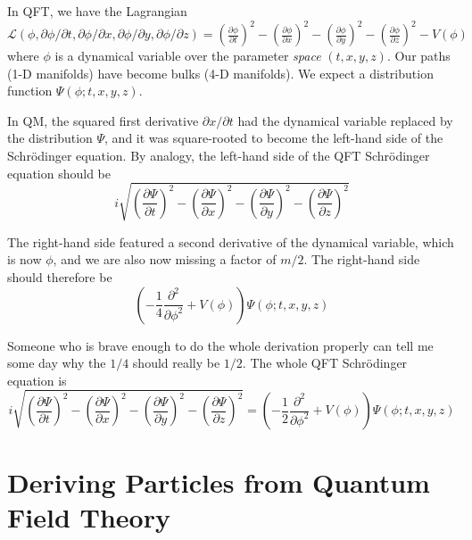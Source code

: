 \documentclass[12pt]{article}
\begin{document}
In QFT, we have the Lagrangian $\mathcal{L}(\phi, \partial
\phi/\partial t, \partial \phi/\partial x, \partial \phi/\partial y,
\partial \phi/\partial z) = \left( \frac{\partial \phi}{\partial t}
\right)^2 - \left( \frac{\partial \phi}{\partial x} \right)^2 - \left(
\frac{\partial \phi}{\partial y} \right)^2 - \left( \frac{\partial
\phi}{\partial z} \right)^2 - V(\phi)$ where $\phi$ is a dynamical
variable over the parameter {\it space} $(t, x, y, z)$.  Our paths
(1-D manifolds) have become bulks (4-D manifolds).  We expect a
distribution function $\Psi(\phi; t, x, y, z)$.

In QM, the squared first derivative $\partial x/\partial t$ had the
dynamical variable replaced by the distribution $\Psi$, and it was
square-rooted to become the left-hand side of the Schr\"odinger
equation.  By analogy, the left-hand side of the QFT Schr\"odinger
equation should be
\begin{equation}
  i\sqrt{\left(\frac{\partial \Psi}{\partial t}\right)^2 -
  \left(\frac{\partial \Psi}{\partial x}\right)^2 - \left(\frac{\partial
  \Psi}{\partial y}\right)^2 - \left(\frac{\partial \Psi}{\partial z}\right)^2}
\end{equation}

The right-hand side featured a second derivative of the dynamical
variable, which is now $\phi$, and we are also now missing a factor of
$m/2$.  The right-hand side should therefore be
\begin{equation}
  \left(-\frac{1}{4} \frac{\partial^2}{\partial \phi^2} + V(\phi)
  \right) \Psi(\phi; t, x, y, z)
\end{equation}

Someone who is brave enough to do the whole derivation properly can
tell me some day why the $1/4$ should really be $1/2$.  The whole
QFT Schr\"odinger equation is
\begin{equation}
  i\sqrt{\left(\frac{\partial \Psi}{\partial t}\right)^2 -
  \left(\frac{\partial \Psi}{\partial x}\right)^2 - \left(\frac{\partial
  \Psi}{\partial y}\right)^2 - \left(\frac{\partial \Psi}{\partial
  z}\right)^2} =
  \left(-\frac{1}{2} \frac{\partial^2}{\partial \phi^2} + V(\phi)
  \right) \Psi(\phi; t, x, y, z)
\label{eqn:qftschrodinger}
\end{equation}

\section{Deriving Particles from Quantum Field Theory}
\end{document}
